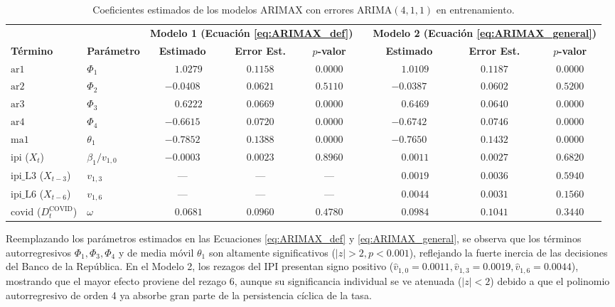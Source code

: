 \documentclass[11pt,letterpaper]{article}
\begin{document}
\begin{table}[H]
\centering
\caption{Coeficientes estimados de los modelos ARIMAX con errores $\text{ARIMA}(4,1,1)$ en entrenamiento.}
\label{tab:coeficientes}
\vspace{2mm}
\begin{tabular}{llccccccc}
\toprule
& & \multicolumn{3}{c}{\textbf{Modelo 1 (Ecuación \ref{eq:ARIMAX_def})}} & & \multicolumn{3}{c}{\textbf{Modelo 2 (Ecuación \ref{eq:ARIMAX_general})}} \\
\cmidrule{3-5} \cmidrule{7-9}
\textbf{Término} & \textbf{Parámetro} & \textbf{Estimado} & \textbf{Error Est.} & \textbf{$p$-valor} & & \textbf{Estimado} & \textbf{Error Est.} & \textbf{$p$-valor} \\
\midrule
$\text{ar1}$ & $\Phi_1$ & $\phantom{-}1.0279$ & $0.1158$ & $0.0000$ & & $\phantom{-}1.0109$ & $0.1187$ & $0.0000$ \\
$\text{ar2}$ & $\Phi_2$ & $-0.0408$ & $0.0621$ & $0.5110$ & & $-0.0387$ & $0.0602$ & $0.5200$ \\
$\text{ar3}$ & $\Phi_3$ & $\phantom{-}0.6222$ & $0.0669$ & $0.0000$ & & $\phantom{-}0.6469$ & $0.0640$ & $0.0000$ \\
$\text{ar4}$ & $\Phi_4$ & $-0.6615$ & $0.0720$ & $0.0000$ & & $-0.6742$ & $0.0746$ & $0.0000$ \\
$\text{ma1}$ & $\theta_1$ & $-0.7852$ & $0.1388$ & $0.0000$ & & $-0.7650$ & $0.1432$ & $0.0000$ \\
\midrule
$\text{ipi}$ ($X_t$) & $\beta_1 / v_{1,0}$ & $-0.0003$ & $0.0023$ & $0.8960$ & & $\phantom{-}0.0011$ & $0.0027$ & $0.6820$ \\
$\text{ipi\_L3}$ ($X_{t-3}$) & $v_{1,3}$ & --- & --- & --- & & $\phantom{-}0.0019$ & $0.0036$ & $0.5940$ \\
$\text{ipi\_L6}$ ($X_{t-6}$) & $v_{1,6}$ & --- & --- & --- & & $\phantom{-}0.0044$ & $0.0031$ & $0.1560$ \\
$\text{covid}$ ($D_t^{\text{COVID}}$) & $\omega$ & $\phantom{-}0.0681$ & $0.0960$ & $0.4780$ & & $\phantom{-}0.0984$ & $0.1041$ & $0.3440$ \\
\bottomrule
\end{tabular}
\end{table}

Reemplazando los parámetros estimados en las Ecuaciones \ref{eq:ARIMAX_def} y \ref{eq:ARIMAX_general}, se observa que los términos autorregresivos $\Phi_1, \Phi_3, \Phi_4$ y de media móvil $\theta_1$ son altamente significativos ($|z| > 2, p < 0.001$), reflejando la fuerte inercia de las decisiones del Banco de la República. En el Modelo 2, los rezagos del IPI presentan signo positivo ($\hat{v}_{1,0}=0.0011, \hat{v}_{1,3}=0.0019, \hat{v}_{1,6}=0.0044$), mostrando que el mayor efecto proviene del rezago 6, aunque su significancia individual se ve atenuada ($|z| < 2$) debido a que el polinomio autorregresivo de orden 4 ya absorbe gran parte de la persistencia cíclica de la tasa.
\end{document}
